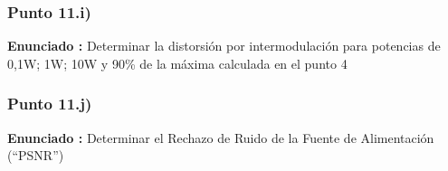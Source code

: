 \documentclass[12pt]{book}
\begin{document}
\subsubsection{Punto 11.i)}
\textbf{Enunciado : } Determinar la distorsión por intermodulación para potencias de 0,1W; 1W; 10W y 90\% de la máxima calculada en el punto 4\\[1cm]

\subsubsection{Punto 11.j)}
\textbf{Enunciado : } Determinar el Rechazo de Ruido de la Fuente de Alimentación (“PSNR”)\\[1cm]
\end{document}
